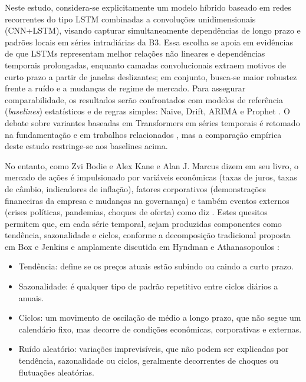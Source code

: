 Neste estudo, considera-se explicitamente um modelo híbrido baseado em redes recorrentes do tipo LSTM combinadas a convoluções unidimensionais (CNN+LSTM), visando capturar simultaneamente dependências de longo prazo e padrões locais em séries intradiárias da B3. Essa escolha se apoia em evidências de que LSTMs representam melhor relações não lineares e dependências temporais prolongadas, enquanto camadas convolucionais extraem motivos de curto prazo a partir de janelas deslizantes; em conjunto, busca-se maior robustez frente a ruído e a mudanças de regime de mercado. Para assegurar comparabilidade, os resultados serão confrontados com modelos de referência (\textit{baselines}) estatísticos e de regras simples: Naive, Drift, ARIMA e Prophet \cite{ding2020, nascimento2023bwaif, box_2015, taylor_2018}. O debate sobre variantes baseadas em Transformers em séries temporais é retomado na fundamentação e em trabalhos relacionados \cite{zeng2022effectiveness, wen2022survey}, mas a comparação empírica deste estudo restringe-se aos baselines acima.

No entanto, como Zvi Bodie e Alex Kane e Alan J. Marcus \cite{BodieKaneMarcus2021} dizem em seu livro, o mercado de ações é impulsionado por variáveis econômicas (taxas de juros, taxas de câmbio, indicadores de inflação), fatores corporativos (demonstrações financeiras da empresa e mudanças na governança) e também eventos externos (crises políticas, pandemias, choques de oferta) como diz \cite{WorldBank2020}. Estes quesitos permitem que, em cada série temporal, sejam produzidas componentes como tendência, sazonalidade e ciclos, conforme a decomposição tradicional proposta em Box e Jenkins \cite{box_2015} e amplamente discutida em Hyndman e Athanasopoulos \cite{hyndman_2018}:

\begin{itemize}
      \item Tendência: define se os preços atuais estão subindo ou caindo a curto prazo.
      \item Sazonalidade: é qualquer tipo de padrão repetitivo entre ciclos diários a anuais.
      \item Ciclos: um movimento de oscilação de médio a longo prazo, que não segue um calendário fixo, mas decorre de condições econômicas, corporativas e externas.
      \item Ruído aleatório: variações imprevisíveis, que não podem ser explicadas por tendência, sazonalidade ou ciclos, geralmente decorrentes de choques ou flutuações aleatórias.
\end{itemize}

